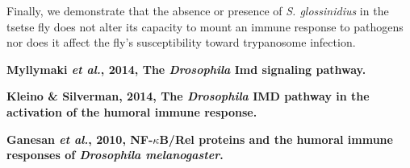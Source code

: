 \documentclass[11pt]{article}
\begin{document}
\begin{sloppypar}
Finally, we demonstrate that the absence or presence of \textit{S. glossinidius} in the tsetse fly does not alter its capacity to mount an immune response to pathogens nor does it affect the fly’s susceptibility toward trypanosome infection.
\par
\textbf{Myllymaki \textit{et al.}, 2014, The \textit{Drosophila} Imd signaling pathway.} \newline
\par
\textbf{Kleino & Silverman, 2014, The \textit{Drosophila} IMD pathway in the activation of the humoral immune response.} \newline
\par
\textbf{Ganesan \textit{et al.}, 2010, NF-$\kappa$B/Rel proteins and the humoral immune responses of \textit{Drosophila melanogaster}.} \newline
\par


\end{sloppypar}
\end{document}
